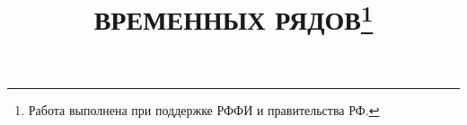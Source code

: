 \documentclass[12pt, twoside]{article}
\begin{document}

\title{ ВРЕМЕННЫХ РЯДОВ\thanks{Работа выполнена при поддержке РФФИ и правительства РФ.}}
\date{}
\maketitle

\end{document}
